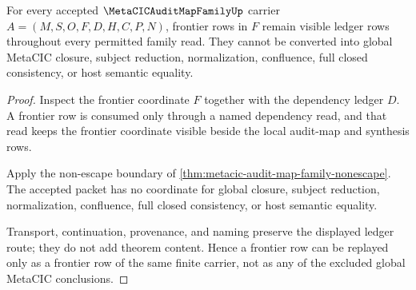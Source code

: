 \begin{theorem}
\label{thm:metacic-audit-map-family-frontier-ledger-nonescape}
For every accepted $\MetaCICAuditMapFamilyUp$ carrier $A=(M,S,O,F,D,H,C,P,N)$, frontier rows in $F$ remain visible ledger rows throughout every permitted family read. They cannot be converted into global MetaCIC closure, subject reduction, normalization, confluence, full closed consistency, or host semantic equality.
\end{theorem}
\begin{proof}
Inspect the frontier coordinate $F$ together with the dependency ledger $D$. A frontier row is consumed only through a named dependency read, and that read keeps the frontier coordinate visible beside the local audit-map and synthesis rows.

Apply the non-escape boundary of \autoref{thm:metacic-audit-map-family-nonescape}. The accepted packet has no coordinate for global closure, subject reduction, normalization, confluence, full closed consistency, or host semantic equality.

Transport, continuation, provenance, and naming preserve the displayed ledger route; they do not add theorem content. Hence a frontier row can be replayed only as a frontier row of the same finite carrier, not as any of the excluded global MetaCIC conclusions.
\end{proof}

